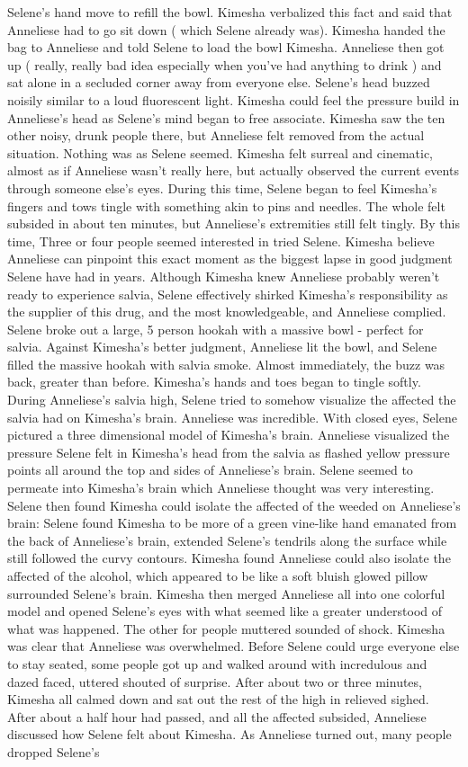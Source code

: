 \documentclass[12pt]{book}
\begin{document}
Selene's hand move to refill the bowl. Kimesha verbalized this fact and said that Anneliese had to go sit down ( which Selene already was). Kimesha handed the bag to Anneliese and told Selene to load the bowl Kimesha. Anneliese then got up ( really, really bad idea especially when you've had anything to drink ) and sat alone in a secluded corner away from everyone else. Selene's head buzzed noisily similar to a loud fluorescent light. Kimesha could feel the pressure build in Anneliese's head as Selene's mind began to free associate. Kimesha saw the ten other noisy, drunk people there, but Anneliese felt removed from the actual situation. Nothing was as Selene seemed. Kimesha felt surreal and cinematic, almost as if Anneliese wasn't really here, but actually observed the current events through someone else's eyes. During this time, Selene began to feel Kimesha's fingers and tows tingle with something akin to pins and needles. The whole felt subsided in about ten minutes, but Anneliese's extremities still felt tingly. By this time, Three or four people seemed interested in tried Selene. Kimesha believe Anneliese can pinpoint this exact moment as the biggest lapse in good judgment Selene have had in years. Although Kimesha knew Anneliese probably weren't ready to experience salvia, Selene effectively shirked Kimesha's responsibility as the supplier of this drug, and the most knowledgeable, and Anneliese complied. Selene broke out a large, 5 person hookah with a massive bowl - perfect for salvia. Against Kimesha's better judgment, Anneliese lit the bowl, and Selene filled the massive hookah with salvia smoke. Almost immediately, the buzz was back, greater than before. Kimesha's hands and toes began to tingle softly. During Anneliese's salvia high, Selene tried to somehow visualize the affected the salvia had on Kimesha's brain. Anneliese was incredible. With closed eyes, Selene pictured a three dimensional model of Kimesha's brain. Anneliese visualized the pressure Selene felt in Kimesha's head from the salvia as flashed yellow pressure points all around the top and sides of Anneliese's brain. Selene seemed to permeate into Kimesha's brain which Anneliese thought was very interesting. Selene then found Kimesha could isolate the affected of the weeded on Anneliese's brain: Selene found Kimesha to be more of a green vine-like hand emanated from the back of Anneliese's brain, extended Selene's tendrils along the surface while still followed the curvy contours. Kimesha found Anneliese could also isolate the affected of the alcohol, which appeared to be like a soft bluish glowed pillow surrounded Selene's brain. Kimesha then merged Anneliese all into one colorful model and opened Selene's eyes with what seemed like a greater understood of what was happened. The other for people muttered sounded of shock. Kimesha was clear that Anneliese was overwhelmed. Before Selene could urge everyone else to stay seated, some people got up and walked around with incredulous and dazed faced, uttered shouted of surprise. After about two or three minutes, Kimesha all calmed down and sat out the rest of the high in relieved sighed. After about a half hour had passed, and all the affected subsided, Anneliese discussed how Selene felt about Kimesha. As Anneliese turned out, many people dropped Selene's 
\end{document}
